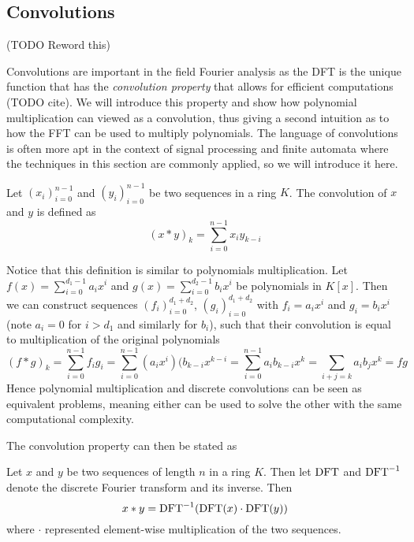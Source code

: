 \subsection{Convolutions}

(TODO Reword this)

Convolutions are important in the field Fourier analysis as the DFT is the unique function that has the \emph{convolution property} that allows for efficient computations (TODO cite). We will introduce this property and show how polynomial multiplication can viewed as a convolution, thus giving a second intuition as to how the FFT can be used to multiply polynomials. The language of convolutions is often more apt in the context of signal processing and finite automata where the techniques in this section are commonly applied, so we will introduce it here.

\begin{definition}
    Let $(x_i)_{i=0}^{n-1}$ and $(y_i)_{i=0}^{n-1}$ be two sequences in a ring $K$. The convolution of $x$ and $y$ is defined as
    \[
        (x \ast y)_k = \sum^{n-1}_{i=0} x_i y_{k-i}
    \]
\end{definition}

Notice that this definition is similar to polynomials multiplication. Let $f(x) = \sum^{d_1 - 1}_{i=0} a_ix^i$ and $g(x) = \sum^{d_2 - 1}_{i=0} b_ix^i$ be polynomials in $K[x]$. Then we can construct sequences $(f_i)_{i=0}^{d_1 + d_2}$, $(g_i)_{i=0}^{d_1 + d_2}$ with $f_i = a_ix^i$ and $g_i = b_ix^i$ (note $a_i = 0$ for $i > d_1$ and similarly for $b_i$), such that their convolution is equal to multiplication of the original polynomials
\[
    (f \ast g)_k = \sum^{n-1}_{i=0} f_i g_i = \sum^{n-1}_{i=0} (a_ix^i)(b_{k-i}x^{k-i} = \sum^{n-1}_{i=0} a_i b_{k-i} x^k = \sum_{i + j = k} a_ib_j x^k = fg
\]
Hence polynomial multiplication and discrete convolutions can be seen as equivalent problems, meaning either can be used to solve the other with the same computational complexity.

The convolution property can then be stated as

\begin{definition}
    Let $x$ and $y$ be two sequences of length $n$ in a ring $K$. Then let $\textrm{DFT}$ and $\textrm{DFT}^{-1}$ denote the discrete Fourier transform and its inverse. Then
    \[
        x \ast y = \textrm{DFT}^{-1}(\textrm{DFT}(x) \cdot \textrm{DFT}(y))
    \]
    where $\cdot$ represented element-wise multiplication of the two sequences.
\end{definition}

